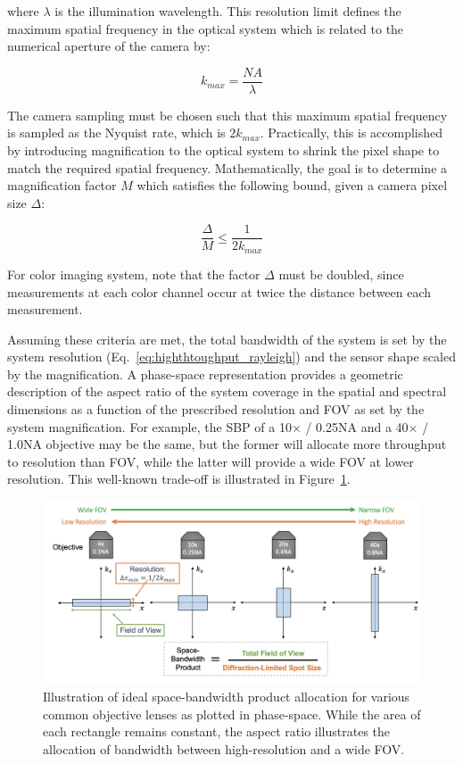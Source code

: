 \noindent where $\lambda$ is the illumination wavelength. This resolution limit defines the maximum spatial frequency in the optical system which is related to the numerical aperture of the camera by:

\begin{equation}
    k_{max} = \frac{NA}{\lambda}
\end{equation}

The camera sampling must be chosen such that this maximum spatial frequency is sampled as the Nyquist rate, which is $2k_{max}$. Practically, this is accomplished by introducing magnification to the optical system to shrink the pixel shape to match the required spatial frequency. Mathematically, the goal is to determine a magnification factor $M$ which satisfies the following bound, given a camera pixel size $\Delta$:

\begin{equation}
    \frac{\Delta}{M} \leq \frac{1}{2k_{max}}
\end{equation}

For color imaging system, note that the factor $\Delta$ must be doubled, since measurements at each color channel occur at twice the distance between each measurement.

Assuming these criteria are met, the total bandwidth of the system is set by the system resolution (Eq.~\ref{eq:highthtoughput_rayleigh}) and the sensor shape scaled by the magnification. A phase-space representation provides a geometric description of the aspect ratio of the system coverage in the spatial and spectral dimensions as a function of the prescribed resolution and FOV as set by the system magnification. For example, the SBP of a 10$\times$ / 0.25NA and a 40$\times$ / 1.0NA objective may be the same, but the former will allocate more throughput to resolution than FOV, while the latter will provide a wide FOV at lower resolution. This well-known trade-off is illustrated in Figure~\ref{fig:highthroughput_sbp}.

\begin{figure}
  \centering
    \includegraphics[width=\textwidth]{figures/fig_highthroughput_sbp.png}
  \caption{\label{fig:highthroughput_sbp} Illustration of ideal space-bandwidth product allocation for various common objective lenses as plotted in phase-space. While the area of each rectangle remains constant, the aspect ratio illustrates the allocation of bandwidth between high-resolution and a wide FOV.}
\end{figure}

